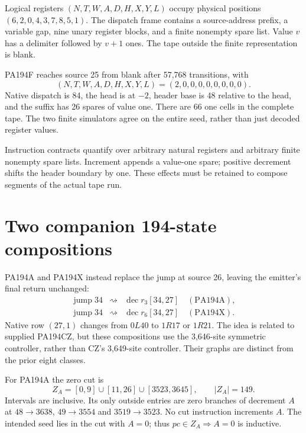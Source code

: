 \documentclass[11pt,letterpaper]{article}
\begin{document}
Logical registers $(N,T,W,A,D,H,X,Y,L)$ occupy physical positions
$(6,2,0,4,3,7,8,5,1)$. The dispatch frame contains a source-address prefix,
a variable gap, nine unary register blocks, and a finite nonempty spare
list. Value $v$ has a delimiter followed by $v+1$ ones. The tape outside
the finite representation is blank.

PA194F reaches source 25 from blank after 57,768 transitions, with
\[
                (N,T,W,A,D,H,X,Y,L)=(2,0,0,0,0,0,0,0,0).
\]
Native dispatch is 84, the head is at $-2$, header base is 48 relative
to the head, and the suffix has 26 spares of value one. There are
66 one cells in the complete tape. The two finite simulators agree
on the entire seed, rather than just decoded register values.

Instruction contracts quantify over arbitrary natural registers and
arbitrary finite nonempty spare lists. Increment appends a value-one
spare; positive decrement shifts the header boundary by one. These
effects must be retained to compose segments of the actual tape run.





\section{Two companion 194-state compositions}
\label{sec:companions}

PA194A and PA194X instead replace the jump at source 26, leaving the
emitter's final return unchanged:
\[
\begin{array}{rcl}
 \operatorname{jump}34&\rightsquigarrow&
 \operatorname{dec}r_3[34,27]\quad(\mathrm{PA194A}),\\
 \operatorname{jump}34&\rightsquigarrow&
 \operatorname{dec}r_6[34,27]\quad(\mathrm{PA194X}).
\end{array}
\]
Native row $(27,1)$ changes from $0L40$ to $1R17$ or $1R21$.
The idea is related to supplied PA194CZ, but these compositions use
the 3,646-site symmetric controller, rather than CZ's 3,649-site
controller. Their graphs are distinct from the prior eight classes.

For PA194A the zero cut is
\[
 Z_A=[0,9]\cup[11,26]\cup[3523,3645],\qquad |Z_A|=149.
\]
Intervals are inclusive. Its only outside entries are zero branches of
decrement $A$ at $48\to3638$, $49\to3554$ and $3519\to3523$.
No cut instruction increments $A$. The intended seed lies in the cut
with $A=0$; thus $pc\in Z_A\Rightarrow A=0$ is inductive.
\end{document}
